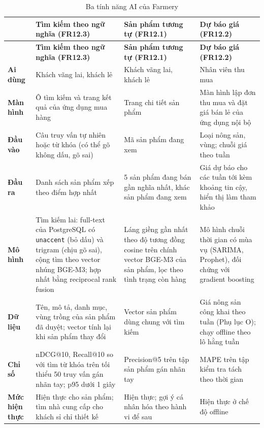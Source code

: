 \begingroup
\tblsetup\tblzebra
\begin{longtable}{L{2.30cm} L{4.20cm} L{4.20cm} L{4.20cm}}
\caption{Ba tính năng AI của Farmery}
\label{tab:tinhnangAI} \\
\toprule
{}
& \textbf{Tìm kiếm theo ngữ nghĩa (FR12.3)} & \textbf{Sản phẩm tương tự (FR12.1)} & \textbf{Dự báo giá (FR12.2)} \\
\midrule
\endfirsthead
\toprule
{}
& \textbf{Tìm kiếm theo ngữ nghĩa (FR12.3)} & \textbf{Sản phẩm tương tự (FR12.1)} & \textbf{Dự báo giá (FR12.2)} \\
\midrule
\endhead
\bottomrule
\endfoot
\textbf{Ai dùng} & Khách vãng lai, khách lẻ & Khách vãng lai, khách lẻ & Nhân viên thu mua \\
\textbf{Màn hình} & Ô tìm kiếm và trang kết quả của ứng dụng mua hàng & Trang chi tiết sản phẩm & Màn hình lập đơn thu mua và đặt giá bán lẻ của ứng dụng nội bộ \\
\textbf{Đầu vào} & Câu truy vấn tự nhiên hoặc từ khóa (có thể gõ không dấu, gõ sai) & Mã sản phẩm đang xem & Loại nông sản, vùng; chuỗi giá theo tuần \\
\textbf{Đầu ra} & Danh sách sản phẩm xếp theo điểm hợp nhất & 5 sản phẩm đang bán gần nghĩa nhất, khác sản phẩm đang xem & Giá dự báo cho các tuần tới kèm khoảng tin cậy, hiển thị làm tham khảo \\
\textbf{Mô hình} & Tìm kiếm lai: full-text của PostgreSQL có \texttt{unaccent} (bỏ dấu) và trigram (chịu gõ sai), cộng tìm theo vector nhúng BGE-M3; hợp nhất bằng reciprocal rank fusion & Láng giềng gần nhất theo độ tương đồng cosine trên chính vector BGE-M3 của sản phẩm, lọc theo tình trạng còn hàng & Mô hình chuỗi thời gian có mùa vụ (SARIMA, Prophet), đối chứng với gradient boosting \\
\textbf{Dữ liệu} & Tên, mô tả, danh mục, vùng trồng của sản phẩm đã duyệt; vector tính lại khi sản phẩm thay đổi & Vector sản phẩm dùng chung với tìm kiếm & Giá nông sản công khai theo tuần (Phụ lục O); chạy offline theo lô hằng tuần \\
\textbf{Chỉ số} & nDCG@10, Recall@10 so với tìm từ khóa trên tối thiểu 50 truy vấn gán nhãn tay; p95 dưới 1 giây & Precision@5 trên tập sản phẩm gán nhãn tay & MAPE trên tập kiểm tra tách theo thời gian \\
\textbf{Mức hiện thực} & Hiện thực cho sản phẩm; tìm nhà cung cấp cho khách sỉ chỉ thiết kế & Hiện thực; gợi ý cá nhân hóa theo hành vi để sau & Hiện thực ở chế độ offline \\
\end{longtable}
\endgroup

